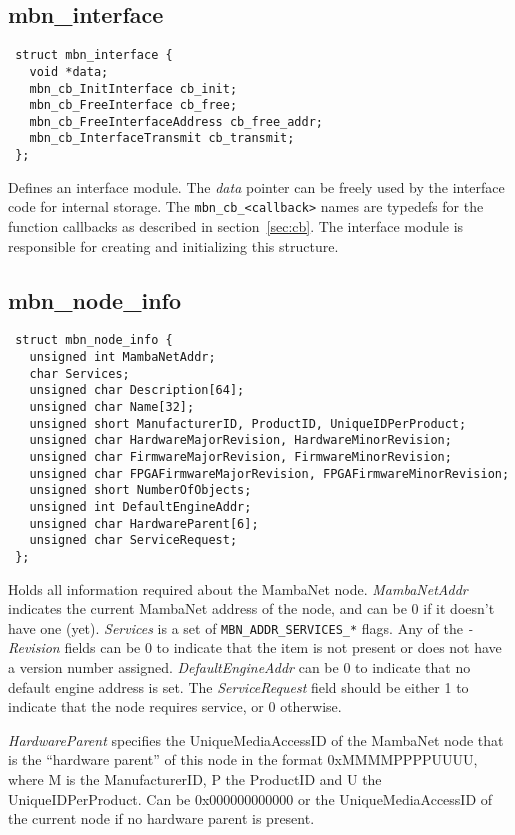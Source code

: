 \documentclass[a4paper]{report}
\begin{document}
\subsection{mbn\_interface}
\begin{verbatim}
 struct mbn_interface {
   void *data;
   mbn_cb_InitInterface cb_init;
   mbn_cb_FreeInterface cb_free;
   mbn_cb_FreeInterfaceAddress cb_free_addr;
   mbn_cb_InterfaceTransmit cb_transmit;
 };
\end{verbatim}
Defines an interface module. The \textit{data} pointer can be freely used by the interface code for internal storage. The \verb|mbn_cb_<callback>| names are typedefs for the function callbacks as described in section\ \ref{sec:cb}.
The interface module is responsible for creating and initializing this structure.


\subsection{mbn\_node\_info}
\begin{verbatim}
 struct mbn_node_info {
   unsigned int MambaNetAddr;
   char Services;
   unsigned char Description[64];
   unsigned char Name[32];
   unsigned short ManufacturerID, ProductID, UniqueIDPerProduct;
   unsigned char HardwareMajorRevision, HardwareMinorRevision;
   unsigned char FirmwareMajorRevision, FirmwareMinorRevision;
   unsigned char FPGAFirmwareMajorRevision, FPGAFirmwareMinorRevision;
   unsigned short NumberOfObjects;
   unsigned int DefaultEngineAddr;
   unsigned char HardwareParent[6];
   unsigned char ServiceRequest;
 };
\end{verbatim}
Holds all information required about the MambaNet node. \textit{MambaNetAddr} indicates the current MambaNet address of the node, and can be 0 if it doesn't have one (yet). \textit{Services} is a set of \verb|MBN_ADDR_SERVICES_*| flags. Any of the \textit{-Revision} fields can be 0 to indicate that the item is not present or does not have a version number assigned. \textit{DefaultEngineAddr} can be 0 to indicate that no default engine address is set. The \textit{ServiceRequest} field should be either 1 to indicate that the node requires service, or 0 otherwise.

\textit{HardwareParent} specifies the UniqueMediaAccessID of the MambaNet node that is the ``hardware parent'' of this node in the format 0xMMMMPPPPUUUU, where M is the ManufacturerID, P the ProductID and U the UniqueIDPerProduct. Can be 0x000000000000 or the UniqueMediaAccessID of the current node if no hardware parent is present.
\end{document}
